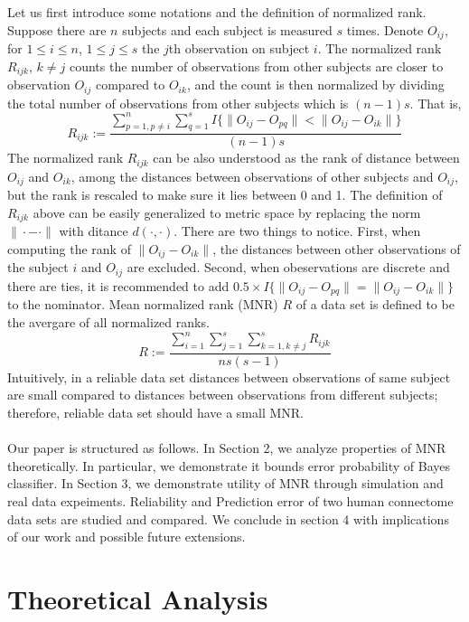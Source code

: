 \documentclass[11pt,journal,compsoc]{IEEEtran}
\begin{document}
Let us first introduce some notations and the definition of normalized rank. Suppose there are $n$ subjects and each subject is measured $s$ times. Denote $O_{ij}$, for $1\leq i \leq n$, $1\leq j \leq s$ the $j$th observation on subject $i$. The normalized rank $R_{ijk}$, $k\neq j$ counts the number of observations from other subjects are closer to observation $O_{ij}$ compared to $O_{ik}$, and the count is then normalized by dividing the total number of observations from other subjects which is $(n-1)s$. That is,
\[R_{ijk} := \frac{\sum\limits_{p=1,p\neq i}^{n} \sum\limits_{q=1}^{s} I\{\|O_{ij}-O_{pq}\| < \|O_{ij}-O_{ik}\| \} }{(n-1)s}\]
 The normalized rank $R_{ijk}$ can be also understood as the rank of distance between $O_{ij}$ and $O_{ik}$, among the distances between observations of other subjects and $O_{ij}$, but the rank is rescaled to make sure it lies between 0 and 1. The definition of $R_{ijk}$ above can be easily generalized to metric space by replacing the norm $\|\cdot-\cdot\|$ with ditance $d(\cdot,\cdot)$. There are two things to notice. First, when computing the rank of $\|O_{ij}-O_{ik}\|$, the distances between other observations of the subject $i$ and $O_{ij}$ are excluded. Second, when obeservations are discrete and there are ties, it is recommended to add $0.5 \times I\{\|O_{ij}-O_{pq}\| = \|O_{ij}-O_{ik}\| \}$ to the nominator. Mean normalized rank (MNR) $R$ of a data set is defined to be the avergare of all normalized ranks. 
\[ R := \frac{\sum\limits_{i=1}^{n} \sum\limits_{j=1}^{s}  \sum\limits_{k=1,k\neq j}^{s} R_{ijk}}{ns(s-1)} \]
Intuitively, in a reliable data set distances between observations of same subject are small compared to distances between observations from different subjects; therefore, reliable data set should have a small MNR. \\
\\
Our paper is structured as follows. In Section 2, we analyze properties of MNR theoretically. In particular, we demonstrate it bounds error probability of Bayes classifier. In Section 3, we demonstrate utility of MNR through simulation and real data expeiments. Reliability and Prediction error of two human connectome data sets are studied and compared. We conclude in section 4 with implications of our work and possible future extensions.



\section{Theoretical Analysis}
\end{document}
